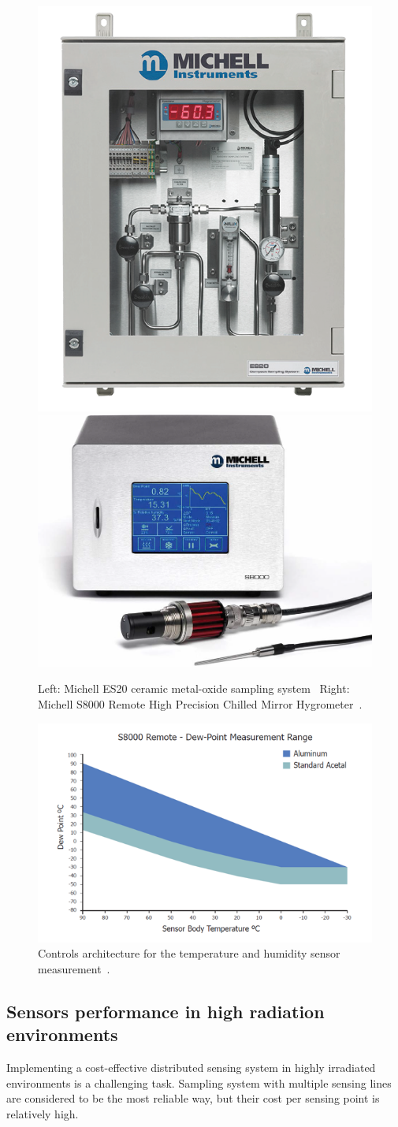 \begin{figure}[!h]
\centering
\includegraphics[width=0.35\columnwidth]{Chapter5/images/ES20.png}
\includegraphics[width=0.4\columnwidth]{Chapter5/images/s8000.png}
\caption{Left: Michell ES20 ceramic metal-oxide sampling system~\cite{michell_e20}
Right: Michell S8000 Remote High Precision Chilled Mirror Hygrometer~\cite{michell_s8000}.}
\label{fig:sniffer}
\end{figure}


\begin{figure}[!h]
\centering
\includegraphics[width=0.65\columnwidth]{Chapter5/images/s8000_remote.png}
\caption{Controls architecture for the temperature and humidity sensor measurement~\cite{michell_s8000}.}
\label{fig:fos_mirror}
\end{figure}
\newpage
\subsection{Sensors performance in high radiation environments}
\label{fos_irrad}
Implementing a cost-effective distributed sensing system in highly irradiated environments is a challenging task. Sampling system with multiple sensing lines are considered to be the most reliable way, but their cost per sensing point is relatively high. 

